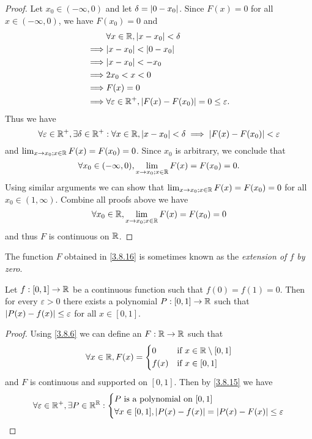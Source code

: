 \begin{proof}
  Let \(x_0 \in (-\infty, 0)\) and let \(\delta = \left\lvert0 - x_0\right\rvert\).
  Since \(F(x) = 0\) for all \(x \in (-\infty, 0)\), we have \(F(x_0) = 0\) and
  \begin{align*}
             & \forall x \in \R, \abs{x - x_0} < \delta                                \\
    \implies & \abs{x - x_0} < \abs{0 - x_0}                                           \\
    \implies & \abs{x - x_0} < -x_0                                                    \\
    \implies & 2x_0 < x < 0                                                            \\
    \implies & F(x) = 0                                                                \\
    \implies & \forall \varepsilon \in \R^+, \abs{F(x) - F(x_0)} = 0 \leq \varepsilon.
  \end{align*}
  Thus we have
  \[
    \forall \varepsilon \in \mathbb{R}^+, \exists \delta \in \mathbb{R}^+ : \forall x \in \mathbb{R}, \left\lvert x - x_0\right\rvert < \delta \implies \left\lvert F(x) - F(x_0)\right\rvert < \varepsilon
  \]
  and \(\lim_{x \to x_0 ; x \in \mathbb{R}} F(x) = F(x_0) = 0\).
  Since \(x_0\) is arbitrary, we conclude that
  \[
    \forall x_0 \in (-\infty, 0), \lim_{x \to x_0 ; x \in \mathbb{R}} F(x) = F(x_0) = 0.
  \]
  Using similar arguments we can show that \(\lim_{x \to x_0 ; x \in \mathbb{R}} F(x) = F(x_0) = 0\) for all \(x_0 \in (1, \infty)\).
  Combine all proofs above we have
  \[
    \forall x_0 \in \mathbb{R}, \lim_{x \to x_0 ; x \in \mathbb{R}} F(x) = F(x_0) = 0
  \]
  and thus \(F\) is continuous on \(\mathbb{R}\).
\end{proof}

\begin{rmk}\label{3.8.17}
  The function \(F\) obtained in \cref{3.8.16} is sometimes known as the \emph{extension of \(f\) by zero}.
\end{rmk}

\begin{cor}\label{3.8.18}
  Let \(f : [0, 1] \to \mathbb{R}\) be a continuous function such that \(f(0) = f(1) = 0\).
  Then for every \(\varepsilon > 0\) there exists a polynomial \(P : [0, 1] \to \mathbb{R}\) such that \(\left\lvert P(x) - f(x)\right\rvert \leq \varepsilon\) for all \(x \in [0, 1]\).
\end{cor}

\begin{proof}
  Using \cref{3.8.6} we can define an \(F : \mathbb{R} \to \mathbb{R}\) such that
  \[
    \forall x \in \mathbb{R}, F(x) = \begin{dcases}
      0    & \text{if } x \in \mathbb{R} \setminus [0, 1] \\
      f(x) & \text{if } x \in [0, 1]
    \end{dcases}
  \]
  and \(F\) is continuous and supported on \([0, 1]\).
  Then by \cref{3.8.15} we have
  \[
    \forall \varepsilon \in \mathbb{R}^+, \exists P \in \mathbb{R}^{\mathbb{R}} : \begin{dcases}
      P \text{ is a polynomial on } [0, 1] \\
      \forall x \in [0, 1], \left\lvert P(x) - f(x)\right\rvert = \left\lvert P(x) - F(x)\right\rvert \leq \varepsilon
    \end{dcases}
  \]
\end{proof}

